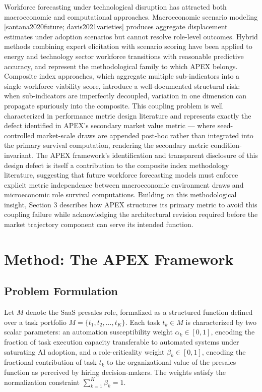 \documentclass[10pt, conference]{IEEEtran}
\begin{document}
Workforce forecasting under technological disruption has attracted both macroeconomic and computational approaches. Macroeconomic scenario modeling [santana2020future; davis2021varieties] produces aggregate displacement estimates under adoption scenarios but cannot resolve role-level outcomes. Hybrid methods combining expert elicitation with scenario scoring \cite{wiser2021expert} have been applied to energy and technology sector workforce transitions with reasonable predictive accuracy, and represent the methodological family to which APEX belongs. Composite index approaches, which aggregate multiple sub-indicators into a single workforce viability score, introduce a well-documented structural risk: when sub-indicators are imperfectly decoupled, variation in one dimension can propagate spuriously into the composite. This coupling problem is well characterized in performance metric design literature \cite{virtanen2020scipy} and represents exactly the defect identified in APEX's secondary market value metric --- where seed-controlled market-scale draws are appended post-hoc rather than integrated into the primary survival computation, rendering the secondary metric condition-invariant. The APEX framework's identification and transparent disclosure of this design defect is itself a contribution to the composite index methodology literature, suggesting that future workforce forecasting models must enforce explicit metric independence between macroeconomic environment draws and microeconomic role survival computations. Building on this methodological insight, Section 3 describes how APEX structures its primary metric to avoid this coupling failure while acknowledging the architectural revision required before the market trajectory component can serve its intended function.

\section{Method: The APEX Framework}

\label{sec:method_the_apex_framework}

\subsection{Problem Formulation}

\label{sec:problem_formulation}

Let $M$ denote the SaaS presales role, formalized as a structured function defined over a task portfolio $M = \{t_1, t_2, \ldots, t_K\}$. Each task $t_k \in M$ is characterized by two scalar parameters: an automation susceptibility weight $\alpha_k \in [0,1]$, encoding the fraction of task execution capacity transferable to automated systems under saturating AI adoption, and a role-criticality weight $\beta_k \in [0,1]$, encoding the fractional contribution of task $t_k$ to the organizational value of the presales function as perceived by hiring decision-makers. The weights satisfy the normalization constraint $\sum_{k=1}^{K} \beta_k = 1$.
\end{document}
